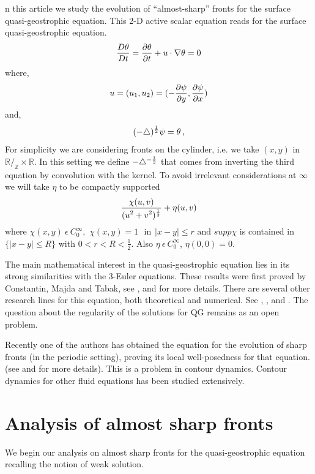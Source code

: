 \documentclass{pnastwo}
\begin{document}
\begin{article}
n this article we study the evolution of ``almost-sharp'' fronts
for the surface quasi-geostrophic equation. This 2-D active scalar
equation reads for the surface quasi-geostrophic equation. 
\begin{equation}
\mfrac{D \theta}{Dt}=\mfrac{\pr \theta}{\pr t} + u\cdot \nabla
\theta=0 \label{qg1}
\end{equation}
where,
\begin{equation}
 u=(u_1,u_2)=(-\mfrac{\pr \psi}{\pr y},\mfrac{\pr \psi}{\pr
x})\label{qg2} \end{equation}
and,
\begin{equation} (-\triangle)^{\f12}\psi=\theta \, ,\label{qg3} \end{equation}
For simplicity we are considering fronts on the cylinder, i.e. we
take $(x,y)$ in $\mathbb{R}/_{\displaystyle{\mathbb{Z}}}\times
\mathbb{R}$. In this setting we define $-\triangle^{-\f12}$ that
comes from inverting the third equation by convolution with the
kernel. To avoid irrelevant considerations at $\infty$ we
will take $\eta$ to be compactly supported
\[
\mfrac{\chi(u,v)}{(u^2+v^2)^{\f12}}+\eta(u,v)
\]
where $\chi (x,y)\ \epsilon\ C^{\infty}_{0},\,\,
\chi(x,y)=1 \hspace{8pt} \mbox{in} \hspace{5pt} |x-y|\leq r \,\,
\mbox{and}\,\, supp \chi$ is contained in $  \{|x-y|\leq R\} $
with $0<r<R<\frac{1}{2}$. Also $ \eta\ \epsilon\ C^{\infty}_0$,
$\eta(0,0)=0 $.

The main mathematical interest in the quasi-geostrophic equation
lies in its strong similarities with the 3-Euler equations. These
results were first proved by Constantin, Majda and Tabak, see
\cite{1}, \cite{2} and \cite{3} for more details. There
are several other research lines for this equation, both
theoretical and numerical. See  \cite{4}, \cite{5}, and
\cite{6}.
The question
about the regularity of the solutions for QG  remains as an open
problem.

Recently one of the authors has obtained the equation for the
evolution of sharp fronts (in the periodic setting), proving its
local well-posedness for that equation. (see \cite{ZhaZha} and
\cite{TSL} for more details). This is a problem in contour
dynamics. Contour dynamics for other fluid equations has been
studied extensively. 


\section{Analysis of almost sharp fronts}
We begin our analysis on almost sharp fronts for the
quasi-geostrophic equation recalling the notion of weak solution.


\end{article}
\end{document}
